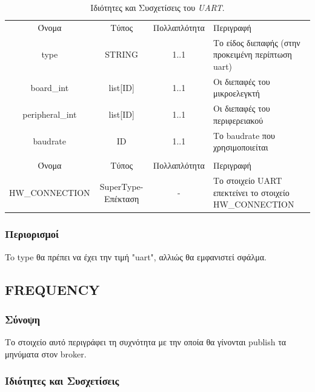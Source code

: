 \begin{table}[H]
	\begin{center}
		\begin{tabular}{ | c | c | c| m{5.5cm} | }
			\hline
			\rowcolor{Gray}
			\multicolumn{4}{|c|}{\textbf{Ιδιότητες}}\\
			\hline
			\rowcolor{Gray}
			Όνομα & Τύπος & Πολλαπλότητα & Περιγραφή \\
			\hline
			type & STRING & 1..1 & Το είδος διεπαφής (στην προκειμένη περίπτωση uart) \\
			\hline
			board\_int & list[ID] & 1..1 & Οι διεπαφές του μικροελεγκτή \\
			\hline
			peripheral\_int & list[ID] & 1..1 & Οι διεπαφές του περιφερειακού \\
			\hline
			baudrate & ID & 1..1 & Το baudrate που χρησιμοποιείται \\
			\hline
			\rowcolor{Gray}
			\multicolumn{4}{|c|}{\textbf{Συσχετίσεις}}\\
			\hline
			\rowcolor{Gray}
			Όνομα & Τύπος & Πολλαπλότητα & Περιγραφή \\
			\hline
			\footnotesize{HW\_CONNECTION} & SuperType-Επέκταση & - &  Το στοιχείο UART επεκτείνει το στοιχείο HW\_CONNECTION \\
			\hline
		\end{tabular}
		\caption{Ιδιότητες και Συσχετίσεις του \textit{UART}.}
		\label{tab:uart_con}
	\end{center}
\end{table}

\subsubsection*{Περιορισμοί}

\noindent To type θα πρέπει να έχει την τιμή "uart", αλλιώς θα εμφανιστεί σφάλμα.

\subsection{FREQUENCY}
\label{subsec:frequency}

\subsubsection*{Σύνοψη}

\noindent Το στοιχείο αυτό περιγράφει τη συχνότητα με την οποία θα γίνονται publish τα μηνύματα στον broker.

\subsubsection*{Ιδιότητες και Συσχετίσεις}

